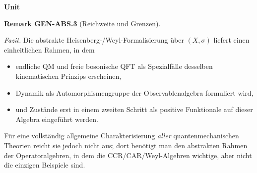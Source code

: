 \documentclass[10pt, letterpaper]{article}
\newcommand{\CustomHeading}[3]{%
  \par\medskip\noindent%
  \textbf{#1 #2} \textnormal{(#3)}.\enskip%
}
\newenvironment{REM}[2]{\begin{unitbox}\CustomHeading{Remark}{#1}{#2}}{\end{unitbox}}
\newenvironment{unit}[1]
  {\begin{unitbox}\textbf{Unit #1}\par\smallskip}
  {\end{unitbox}}
\begin{document}
\begin{unit}{}
\begin{REM}{GEN-ABS.3}{Reichweite und Grenzen}
\emph{Fazit.}
Die abstrakte Heisenberg-/Weyl-Formalisierung über \((X,\sigma)\)
liefert einen einheitlichen Rahmen, in dem
\begin{itemize}
\item endliche QM und freie bosonische QFT
      als Spezialfälle desselben kinematischen Prinzips erscheinen,
\item Dynamik als Automorphismengruppe der Observablenalgebra formuliert wird,
\item und Zustände erst in einem zweiten Schritt als positive Funktionale
      auf dieser Algebra eingeführt werden.
\end{itemize}
Für eine vollständig allgemeine Charakterisierung \emph{aller} quantenmechanischen
Theorien reicht sie jedoch nicht aus; dort benötigt man
den abstrakten Rahmen der Operatoralgebren, in dem die CCR/CAR/Weyl-Algebren
wichtige, aber nicht die einzigen Beispiele sind.
\end{REM}
\end{unit}
\end{document}
